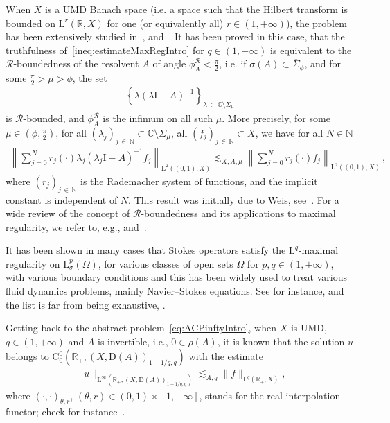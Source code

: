 \documentclass[AHL,Unicode,longabstracts,published]{cedram}
\newcommand{\bbR}{\mathbb{R}}
\newcommand{\bbC}{\mathbb{C}}
\newcommand{\bbN}{\mathbb{N}}
\newcommand{\rmD}{\mathrm{D}}
\newcommand{\rmL}{\mathrm{L}}
\newcommand{\rmC}{\mathrm{C}}
\newcommand{\rmI}{\mathrm{I}}
\newcommand{\clR}{\mathcal{R}}
\begin{document}
When $X$ is a UMD Banach space (i.e. a space such that the Hilbert transform is bounded on $\rmL^r(\bbR,X)$ for one (or equivalently all) $r\in(1,+\infty)$), the problem has been extensively studied in~\cite[Chapter~III,~Section~4]{AmmanBookParabolicVolI1995}, \cite{bookDenkHieberPruss2003} and~\cite{KunstmannWeis2004}. It has been proved in this case, that the truthfulness of~\eqref{ineq:estimateMaxRegIntro} for $q\in(1,+\infty)$ is equivalent to the $\clR$-boundedness of the resolvent $A$ of angle $\phi_{{A}}^{\clR}<\frac{\pi}{2}$, i.e. if $\sigma(A)\subset \overline{\Sigma}_{\phi}$, and for some $\frac{\pi}{2}>\mu>\phi$, the set
\begin{align*}
\left\{\lambda(\lambda \rmI -A)^{-1}\right\}_{\lambda\,\in \,\bbC\setminus {\Sigma}_{\mu}}
\end{align*}
is $\clR$-bounded, and $\phi_{{A}}^{\clR}$ is the infimum on all such $\mu$. More precisely, for some $\mu\in(\phi,\frac{\pi}{2})$, for all $(\lambda_j)_{j\,\in\,\bbN} \subset\bbC\setminus {\Sigma}_{\mu}$, all $(f_j)_{j\,\in\,\bbN} \subset X$, we have for all $N\in\bbN$
\begin{align*}
\left\| \sum_{j=0}^{N} r_j(\cdot) \lambda_{j}\left(\lambda_j\rmI -A\right)^{-1}f_j\right\|_{\rmL^2((0,1),X)} \lesssim_{X,A,\mu} \left\| \sum_{j=0}^{N} r_j(\cdot)f_j\right\|_{\rmL^2((0,1),X)}\,,
\end{align*}
where $(r_j)_{j\,\in\,\bbN}$ is the Rademacher system of functions, and the implicit constant is independent of $N$. This result was initially due to Weis, see~\cite[Theorem~4.2]{Weis2001}. For a wide review of the concept of $\clR$-boundedness and its applications to maximal regularity, we refer to, e.g., \cite{bookDenkHieberPruss2003,KunstmannWeis2004} and~\cite{DenkKrainer2007}.

It has been shown in many cases that Stokes operators satisfy the $\rmL^q$-maximal regularity on $\rmL^p_{\sigma}(\Omega)$, for various classes of open sets $\Omega$ for $p,q\in(1,+\infty)$, with various boundary conditions and this has been widely used to treat various fluid dynamics problems, mainly Navier--Stokes equations. See for instance, and the list is far from being exhaustive, \cite{GigaSohr1991,HieberMonniaux2013,
HieberNesensohnPrussSchade2016,
Hieber2020,MitreaMonniaux2009-1,
Monniaux2013,Monniaux2021,Tolksdorf2018-1,
TolksdorfWatanabe}.

Getting back to the abstract problem~\eqref{eq:ACPinftyIntro}, when $X$ is UMD, $q\in(1,+\infty)$ and $A$ is invertible, i.e., $0\in\rho(A)$, it is known that the solution $u$ belongs to $\rmC ^0_0(\bbR_+,(X,\rmD(A))_{1-1/q,q})$ with the estimate
\begin{align}\label{eq:estimatecontinuousMaxRegIntro}
\| u \|_{\rmL^{\infty}\left(\bbR_+,(X,\rmD(A))_{1-1/q,q}\right)} \lesssim_{A,q} \| f\|_{\rmL^q\left(\bbR_+,X\right)},
\end{align}
where $(\cdot,\cdot)_{\theta,r}$, $(\theta,r)\in(0,1)\times [1,+\infty]$, stands for the real interpolation functor; check for instance~\cite[Chapter~III,~Theorem~4.10.2]{AmmanBookParabolicVolI1995}.
\end{document}
